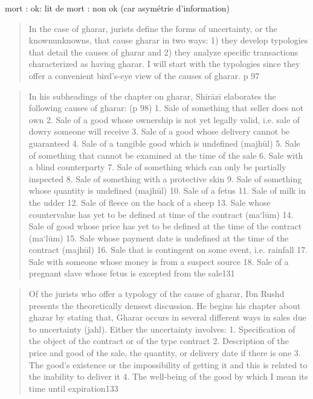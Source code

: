 mort : ok: lit de mort : non ok (car asymétrie d'information)
 
 \begin{quote}
     In the case of gharar, jurists define the forms of uncertainty, or the knownunknowns,
that cause gharar in two ways: 1) they develop typologies that detail the
causes of gharar and 2) they analyze specific transactions characterized as having
gharar. I will start with the typologies since they offer a convenient bird’s-eye view of
the causes of gharar. p 97
 \end{quote}
 
 \begin{quote}
 
 In his subheadings of the chapter on gharar, Shīrāzī elaborates the following
causes of gharar: (p 98)
     1. Sale of something that seller does not own
2. Sale of a good whose ownership is not yet legally valid, i.e. sale of dowry
someone will receive
3. Sale of a good whose delivery cannot be guaranteed
4. Sale of a tangible good which is undefined (majhūl)
5. Sale of something that cannot be examined at the time of the sale
6. Sale with a blind counterparty
7. Sale of something which can only be partially inspected
8. Sale of something with a protective skin
9. Sale of something whose quantity is undefined (majhūl)
10. Sale of a fetus
11. Sale of milk in the udder
12. Sale of fleece on the back of a sheep
13. Sale whose countervalue has yet to be defined at time of the contract
(ma‘lūm)
14. Sale of good whose price has yet to be defined at the time of the contract
(ma‘lūm)
15. Sale whose payment date is undefined at the time of the contract (majhūl)
16. Sale that is contingent on some event, i.e. rainfall
17. Sale with someone whose money is from a suspect source
18. Sale of a pregnant slave whose fetus is excepted from the sale131
 \end{quote}
 
 \begin{quote}
     Of the jurists who offer a typology of the cause of gharar, Ibn Rushd presents the
theoretically densest discussion. He begins his chapter about gharar by stating that,
Gharar occurs in several different ways in sales due to
uncertainty (jahl). Either the uncertainty involves:
1. Specification of the object of the contract or of the type
contract
2. Description of the price and good of the sale, the quantity, or
delivery date if there is one
3. The good’s existence or the impossibility of getting it and this
is related to the inability to deliver it
4. The well-being of the good by which I mean its time until
expiration133
 \end{quote}
 
